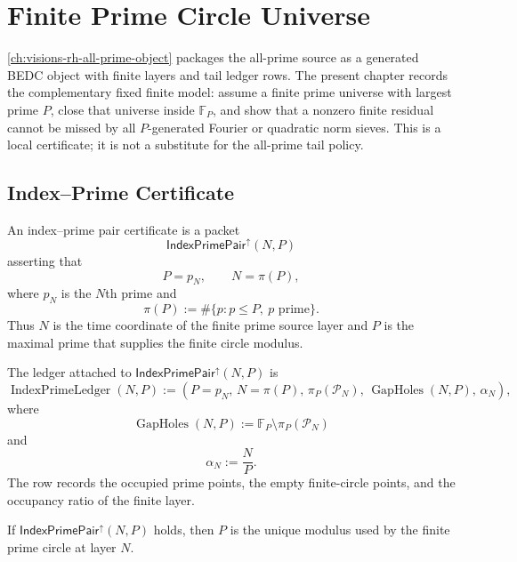 \chapter{Finite Prime Circle Universe}
\label{ch:visions-rh-finite-prime-circle-universe}

\autoref{ch:visions-rh-all-prime-object} packages the all-prime source
as a generated BEDC object with finite layers and tail ledger rows.  The
present chapter records the complementary fixed finite model: assume a
finite prime universe with largest prime $P$, close that universe inside
$\mathbb F_P$, and show that a nonzero finite residual cannot be missed
by all $P$-generated Fourier or quadratic norm sieves.  This is a local
certificate; it is not a substitute for the all-prime tail policy.

\section{Index--Prime Certificate}
\label{sec:rh-finite-prime-circle-universe-index-prime}

\begin{definition}[IndexPrimePair]
\label{def:rh-index-prime-pair}
An index--prime pair certificate is a packet
$$
\mathsf{IndexPrimePair}^{\uparrow}(N,P)
$$
asserting that
$$
P=p_N,
\qquad
N=\pi(P),
$$
where $p_N$ is the $N$th prime and
$$
\pi(P):=\#\{p:p\le P,\ p\text{ prime}\}.
$$
Thus $N$ is the time coordinate of the finite prime source layer and
$P$ is the maximal prime that supplies the finite circle modulus.
\end{definition}

\begin{definition}[IndexPrimeLedger]
\label{def:rh-index-prime-ledger}
The ledger attached to
$\mathsf{IndexPrimePair}^{\uparrow}(N,P)$ is
$$
\operatorname{IndexPrimeLedger}(N,P)
:=
\left(
P=p_N,\,
N=\pi(P),\,
\pi_P(\mathcal P_N),\,
\operatorname{GapHoles}(N,P),\,
\alpha_N
\right),
$$
where
$$
\operatorname{GapHoles}(N,P)
:=
\mathbb F_P\setminus\pi_P(\mathcal P_N)
$$
and
$$
\alpha_N:=\frac{N}{P}.
$$
The row records the occupied prime points, the empty finite-circle
points, and the occupancy ratio of the finite layer.
\end{definition}

\begin{theorem}
\label{thm:rh-index-prime-pair-legal-modulus}
If $\mathsf{IndexPrimePair}^{\uparrow}(N,P)$ holds, then $P$ is the
unique modulus used by the finite prime circle at layer $N$.
\end{theorem}

